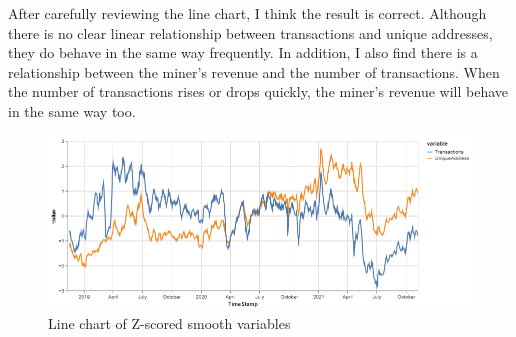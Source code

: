 \documentclass[a4paper]{article}
\begin{document}
\par After carefully reviewing the line chart, I think the result is correct. Although there is no clear linear relationship between transactions and unique addresses, they do behave in the same way frequently. In addition, I also find there is a relationship between the miner's revenue and the number of transactions. When the number of transactions rises or drops quickly, the miner's revenue will behave in the same way too.
\begin{figure}[H]
    \centering
    \includegraphics[scale=0.5]{TransactionAddress.png}
    \caption{Line chart of Z-scored smooth variables}
\end{figure}
\end{document}
